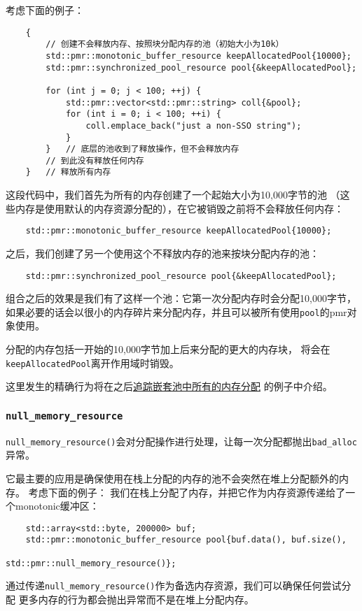 考虑下面的例子：
\begin{lstlisting}
    {
        // 创建不会释放内存、按照块分配内存的池（初始大小为10k）
        std::pmr::monotonic_buffer_resource keepAllocatedPool{10000};
        std::pmr::synchronized_pool_resource pool{&keepAllocatedPool};

        for (int j = 0; j < 100; ++j) {
            std::pmr::vector<std::pmr::string> coll{&pool};
            for (int i = 0; i < 100; ++i) {
                coll.emplace_back("just a non-SSO string");
            }
        }   // 底层的池收到了释放操作，但不会释放内存
        // 到此没有释放任何内存
    }   // 释放所有内存
\end{lstlisting}
这段代码中，我们首先为所有的内存创建了一个起始大小为10,000字节的池
（这些内存是使用默认的内存资源分配的），在它被销毁之前将不会释放任何内存：
\begin{lstlisting}
    std::pmr::monotonic_buffer_resource keepAllocatedPool{10000};
\end{lstlisting}
之后，我们创建了另一个使用这个不释放内存的池来按块分配内存的池：
\begin{lstlisting}
    std::pmr::synchronized_pool_resource pool{&keepAllocatedPool};
\end{lstlisting}
组合之后的效果是我们有了这样一个池：它第一次分配内存时会分配10,000字节，
如果必要的话会以很小的内存碎片来分配内存，并且可以被所有使用\texttt{pool}的pmr对象使用。

分配的内存包括一开始的10,000字节加上后来分配的更大的内存块，
将会在\texttt{keepAllocatedPool}离开作用域时销毁。

这里发生的精确行为将在之后\hyperref[追踪嵌套池的allocation]{追踪嵌套池中所有的内存分配}
的例子中介绍。\label{嵌套池}

\subsubsection{\texttt{null\_memory\_resource}}
\texttt{null\_memory\_resource()}会对分配操作进行处理，让每一次分配都抛出\texttt{bad\_alloc}异常。

它最主要的应用是确保使用在栈上分配的内存的池不会突然在堆上分配额外的内存。
考虑下面的例子：
我们在栈上分配了内存，并把它作为内存资源传递给了一个monotonic缓冲区：
\begin{lstlisting}
    std::array<std::byte, 200000> buf;
    std::pmr::monotonic_buffer_resource pool{buf.data(), buf.size(),
                                             std::pmr::null_memory_resource()};
\end{lstlisting}
通过传递\texttt{null\_memory\_resource()}作为备选内存资源，我们可以确保任何尝试分配
更多内存的行为都会抛出异常而不是在堆上分配内存。

